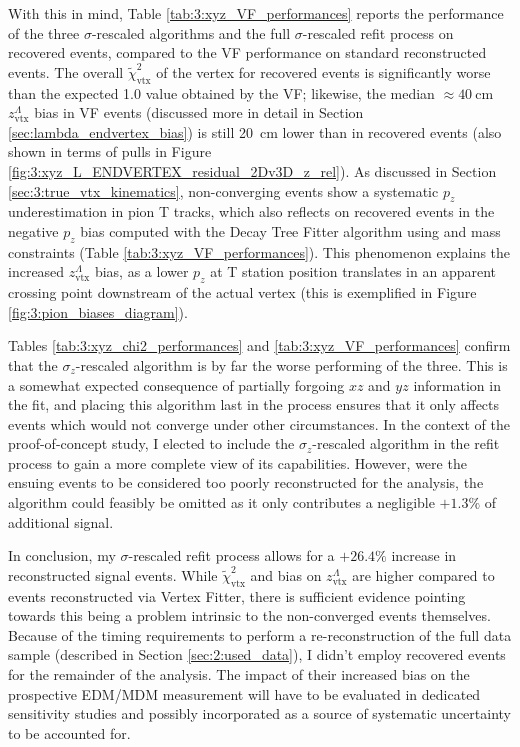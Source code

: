 With this in mind, Table \ref{tab:3:xyz_VF_performances} reports the performance of the three $\sigma$-rescaled algorithms and the full $\sigma$-rescaled refit process on recovered events, compared to the VF performance on standard reconstructed events.
The overall $\tilde{\chi}^2_\text{vtx}$ of the \lambdadecay vertex for recovered events is significantly worse than the expected 1.0 value obtained by the VF;
likewise, the median $\approx \SI{40}{\centi\meter}$ $z_\text{vtx}^\Lambda$ bias in VF events (discussed more in detail in Section \ref{sec:lambda_endvertex_bias}) is still \SI{20}{\centi\meter} lower than in recovered events (also shown in terms of pulls in Figure \ref{fig:3:xyz_L_ENDVERTEX_residual_2Dv3D_z_rel}).
As discussed in Section \ref{sec:3:true_vtx_kinematics}, non-converging events show a systematic $p_z$ underestimation in pion T tracks, which also reflects on recovered events in the negative $p_z$ bias computed with the Decay Tree Fitter algorithm using \jpsi and \lz mass constraints (Table \ref{tab:3:xyz_VF_performances}).
This phenomenon explains the increased $z_\text{vtx}^\Lambda$ bias, as a lower $p_z$ at T station position translates in an apparent crossing point downstream of the actual vertex (this is exemplified in Figure \ref{fig:3:pion_biases_diagram}).


Tables \ref{tab:3:xyz_chi2_performances} and \ref{tab:3:xyz_VF_performances} confirm that the $\sigma_z$-rescaled algorithm is by far the worse performing of the three.
This is a somewhat expected consequence of partially forgoing $xz$ and $yz$ information in the fit, and placing this algorithm last in the process ensures that it only affects events which would not converge under other circumstances.
In the context of the proof-of-concept study, I elected to include the $\sigma_z$-rescaled algorithm in the refit process to gain a more complete view of its capabilities.
However, were the ensuing events to be considered too poorly reconstructed for the \lz analysis, the algorithm could feasibly be omitted as it only contributes a negligible $+1.3\%$ of additional signal.

In conclusion, my $\sigma$-rescaled refit process allows for a $+26.4\%$ increase in reconstructed signal events.
While $\tilde{\chi}^2_\text{vtx}$ and bias on $z_\text{vtx}^\Lambda$ are higher compared to events reconstructed via Vertex Fitter, there is sufficient evidence pointing towards this being a problem intrinsic to the non-converged events themselves.
Because of the timing requirements to perform a re-reconstruction of the full data sample (described in Section \ref{sec:2:used_data}), I didn't employ recovered events for the remainder of the analysis.
The impact of their increased bias on the prospective \lz EDM/MDM measurement will have to be evaluated in dedicated sensitivity studies and possibly incorporated as a source of systematic uncertainty to be accounted for.


